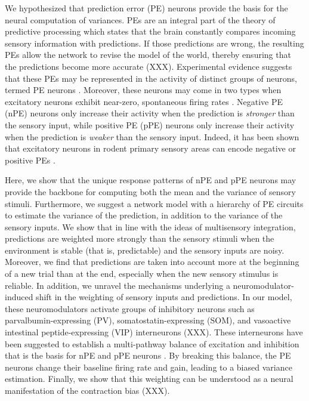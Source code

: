 \documentclass[10pt,a4paper,draft]{article}
\begin{document}
We hypothesized that prediction error (PE) neurons provide the basis for the neural computation of variances. PEs are an integral part of the theory of predictive processing which states that the brain constantly compares incoming sensory information with predictions. If those predictions are wrong, the resulting PEs allow the network to revise the model of the world, thereby ensuring that the predictions become more accurate (XXX). Experimental evidence suggests that these PEs may be represented in the activity of distinct groups of neurons, termed PE neurons \citep{eliades2008neural, keller2009neural, ayaz2019layer, audette2021temporally}. Moreover, these neurons may come in two types when excitatory neurons exhibit near-zero, spontaneous firing rates \cite{rao1999predictive, keller2018predictive}. Negative PE (nPE) neurons only increase their activity when the prediction is \textit{stronger} than the sensory input, while positive PE (pPE) neurons only increase their activity when the prediction is \textit{weaker} than the sensory input. Indeed, it has been shown that excitatory neurons in rodent primary sensory areas can encode negative or positive PEs \citep{keller2012sensorimotor, attinger2017visuomotor, jordan2020opposing, audette2021temporally}. 

Here, we show that the unique response patterns of nPE and pPE neurons may provide the backbone for computing both the mean and the variance of sensory stimuli. Furthermore, we suggest a network model with a hierarchy of PE circuits to estimate the variance of the prediction, in addition to the variance of the sensory inputs. We show that in line with the ideas of multisensory integration, predictions are weighted more strongly than the sensory stimuli when the environment is stable (that is, predictable) and the sensory inputs are noisy. Moreover, we find that predictions are taken into account more at the beginning of a new trial than at the end, especially when the new sensory stimulus is reliable. In addition, we unravel the mechanisms underlying a neuromodulator-induced shift in the weighting of sensory inputs and predictions. In our model, these neuromodulators activate groups of inhibitory neurons such as parvalbumin-expressing (PV), somatostatin-expressing (SOM), and vasoactive intestinal peptide-expressing (VIP) interneurons (XXX). These interneurons have been suggested to establish a multi-pathway balance of excitation and inhibition that is the basis for nPE and pPE neurons \citep{hertag2020learning, hertag2022prediction}. By breaking this balance, the PE neurons change their baseline firing rate and gain, leading to a biased variance estimation. Finally, we show that this weighting can be understood as a neural manifestation of the contraction bias (XXX). 
\end{document}
